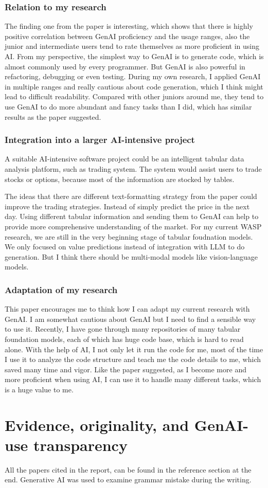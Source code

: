 \documentclass[11pt]{article}
\begin{document}
\subsubsection{Relation to my research}

The finding one from the paper is interesting, which shows that there is highly positive correlation between GenAI proficiency and the usage ranges, also the junior and intermediate users tend to rate themselves as more proficient in using AI. From my perspective, the simplest way to GenAI is to generate code, which is almost commonly used by every programmer. But GenAI is also powerful in refactoring, debugging or even testing. During my own research, I applied GenAI in multiple ranges and really cautious about code generation, which I think might lead to difficult readability. Compared with other juniors around me, they tend to use GenAI to do more abundant and fancy tasks than I did, which has similar results as the paper suggested. 

\subsubsection{Integration into a larger AI-intensive project}

A suitable AI-intensive software project could be an intelligent tabular data analysis platform, such as trading system. The system would assist users to trade stocks or options, because most of the information are stocked by tables. 

The ideas that there are different text-formatting strategy  from the paper could improve the trading strategies. Instead of simply predict the price in the next day. Using different tabular information and sending them to GenAI can help to provide more comprehensive understanding of the market.  For my current WASP research, we are still in the very beginning stage of tabular foudnation models. We only focused on value predictions instead of integration with LLM to do generation. But I think there should be multi-modal models like vision-language models.  

\subsubsection{Adaptation of my research}

This paper encourages me to think how I can adapt my current research with GenAI. I am somewhat cautious about GenAI but I need to find a sensible way to use it. Recently, I have gone through many repositories of many tabular foundation models, each of which has huge code base, which is hard to read alone. With the help of AI, I not only let it run the code for me, most of the time I use it to analyze the code structure and teach me the code details to me, which saved many time and vigor. Like the paper suggested, as I become more and more proficient when using AI, I can use it to handle many different tasks, which is a huge value to me. 


\section{Evidence, originality, and GenAI-use transparency}
All the papers cited in the report, can be found in the reference section at the end. Generative AI was used to examine grammar mistake during the writing. 






\end{document}
